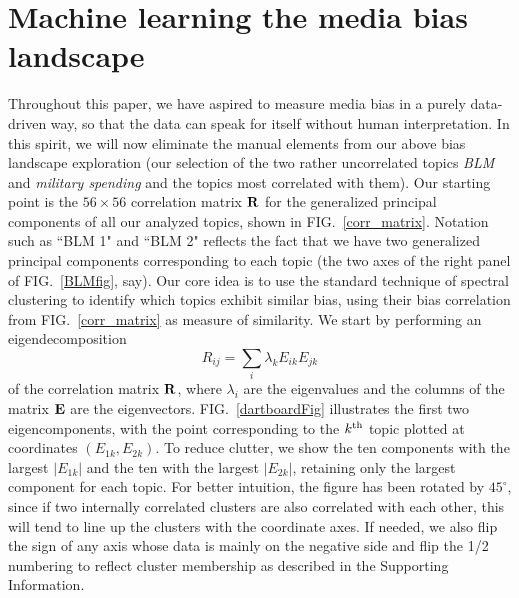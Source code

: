 \documentclass[10pt,letterpaper]{article}
\def\E{{\bf E}}
\def\R{{\bf R}}
\def\kth{k^{\rm th}}
\def\beq#1{\begin{equation}\label{#1}}
\def\eeq{\end{equation}}
\def\fig#1{FIG.~\ref{#1}}
\def\Fig#1{FIG.~\ref{#1}}
\begin{document}
\section*{Machine learning the media bias landscape}
Throughout this paper, we have aspired to measure media bias in a purely 
data-driven way, so that the data can speak for itself without human 
interpretation. In this spirit, we will now eliminate the manual elements from our above bias landscape exploration
(our selection of the two rather uncorrelated topics {\it BLM} and {\it military spending} and the topics most correlated with them).
Our starting point is the $56\times 56$ correlation matrix $\R$ for the generalized principal 
components of all our analyzed topics, shown in \fig{corr_matrix}. 
Notation such as ``BLM 1" and ``BLM 2" reflects the fact that we have two generalized principal 
components corresponding to each topic (the two axes of the right panel of \fig{BLMfig}, say).
Our core idea is to use the standard technique of spectral clustering \cite{ng2002spectral} to identify which topics exhibit similar bias, 
using their bias correlation from \fig{corr_matrix} as measure of similarity.
We start by performing an eigendecomposition
\beq{SpectralDecompositionEq}
R_{ij} = \sum_i\lambda_k E_{ik} E_{jk}
\eeq
of the correlation matrix $\R$, where $\lambda_i$ are the eigenvalues and the columns of the matrix $\E$ are the eigenvectors.
\Fig{dartboardFig} illustrates the first two eigencomponents, with the point corresponding to the $\kth$ topic plotted at coordinates $(E_{1k},E_{2k})$.
To reduce clutter, we show the ten components with the largest $|E_{1k}|$ and the ten with the largest $|E_{2k}|$, retaining only the largest component for each topic. For better intuition, the figure has been rotated by $45^\circ$, since if two internally correlated clusters are also correlated with each other, this will tend to line up the clusters with the coordinate axes. If needed, we also flip the sign of any axis whose data is mainly on the negative side and flip the 1/2 numbering to reflect cluster membership as described in the Supporting Information.
\end{document}
